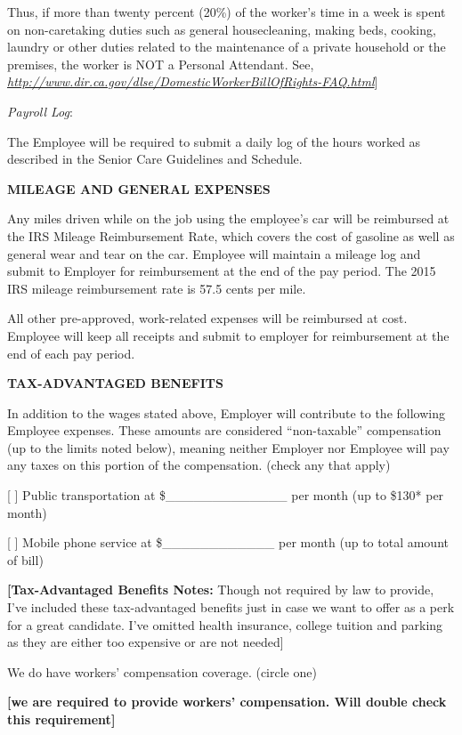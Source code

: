 \documentclass[]{article}
\begin{document}
Thus, if more than twenty percent (20\%) of the worker's time in a week
is spent on non-caretaking duties such as general housecleaning, making
beds, cooking, laundry or other duties related to the maintenance of a
private household or the premises, the worker is NOT a Personal
Attendant. See,
\href{http://www.dir.ca.gov/dlse/DomesticWorkerBillOfRights-FAQ.html}{\emph{http://www.dir.ca.gov/dlse/DomesticWorkerBillOfRights-FAQ.html}}{]}

\emph{Payroll Log}:

The Employee will be required to submit a daily log of the hours worked
as described in the Senior Care Guidelines and Schedule.

\textbf{MILEAGE AND GENERAL EXPENSES}

Any miles driven while on the job using the employee's car will be
reimbursed at the IRS Mileage Reimbursement Rate, which covers the cost
of gasoline as well as general wear and tear on the car. Employee will
maintain a mileage log and submit to Employer for reimbursement at the
end of the pay period. The 2015 IRS mileage reimbursement rate is 57.5
cents per mile.

All other pre-approved, work-related expenses will be reimbursed at
cost. Employee will keep all receipts and submit to employer for
reimbursement at the end of each pay period.

\textbf{TAX-ADVANTAGED BENEFITS}

In addition to the wages stated above, Employer will contribute to the
following Employee expenses. These amounts are considered
``non-taxable'' compensation (up to the limits noted below), meaning
neither Employer nor Employee will pay any taxes on this portion of the
compensation. (check any that apply)

[ ] Public transportation at \$\_\_\_\_\_\_\_\_\_\_\_\_\_ per month (up to
\$130* per month)

[ ] Mobile phone service at \$\_\_\_\_\_\_\_\_\_\_\_\_ per month (up to
total amount of bill)

\textbf{{[}Tax-Advantaged Benefits Notes:} Though not required by law to
provide, I've included these tax-advantaged benefits just in case we
want to offer as a perk for a great candidate. I've omitted health
insurance, college tuition and parking as they are either too expensive
or are not needed{]}

We do have workers' compensation coverage. (circle one)

\textbf{{[}we are required to provide workers' compensation. Will double
check this requirement{]}}
\end{document}
